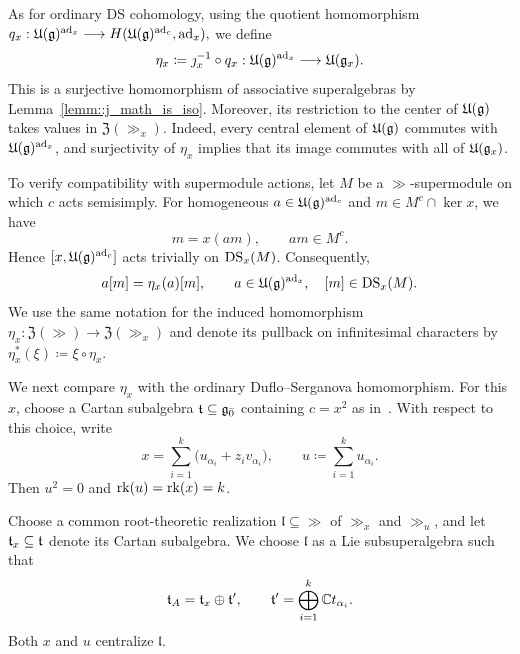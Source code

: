 As for ordinary DS cohomology, using the quotient homomorphism
$
q_x:\UE(\gg)^{\ad_x}
\longrightarrow H(\UE(\gg)^{\ad_c},\ad_x),
$
we define
\begin{equation}\label{eq::generalized_DS_eta}
\eta_x\coloneqq\jmath_x^{-1}\circ q_x:
\UE(\gg)^{\ad_x}\longrightarrow\UE(\gg_x).
\end{equation}
This is a surjective homomorphism of associative superalgebras by Lemma~\ref{lemm::j_math_is_iso}. Moreover, its restriction to the center of $\UE(\gg)$ takes values in $\mathfrak{Z}(\gg_x)$. Indeed, every central element of $\UE(\gg)$ commutes with $\UE(\gg)^{\ad_x}$, and surjectivity of $\eta_x$ implies that its image commutes with all of $\UE(\gg_x)$.

To verify compatibility with supermodule actions, let $M$ be a $\gg$-supermodule on which $c$ acts semisimply. For homogeneous $a\in\UE(\gg)^{\ad_c}$ and $m\in M^c\cap\ker x$, we have
\begin{equation}
[x,a]m=x(am),
\qquad am\in M^c.
\end{equation}
Hence $[x,\UE(\gg)^{\ad_c}]$ acts trivially on $\DS_x(M)$. Consequently,
\begin{equation}\label{eq::generalized_DS_eta_action}
a[m]=\eta_x(a)[m],
\qquad
a\in\UE(\gg)^{\ad_x},\quad [m]\in\DS_x(M).
\end{equation}
We use the same notation for the induced homomorphism
$
\eta_x:\mathfrak{Z}(\gg)\longrightarrow\mathfrak{Z}(\gg_x)
$
and denote its pullback on infinitesimal characters by
$
\eta_x^{\ast}(\xi)\coloneqq\xi\circ\eta_x.
$

We next compare $\eta_x$ with the ordinary Duflo--Serganova homomorphism. 
For this $x$, choose a Cartan subalgebra $\tt\subseteq\even$ containing $c=x^2$ as in~\cite[Lemma~3.9]{Sherman2025}. With respect to this choice, write
\begin{equation}
x=\sum_{i=1}^{k}
\bigl(u_{\alpha_i}+z_i v_{\alpha_i}\bigr),
\qquad
u\coloneqq\sum_{i=1}^{k}u_{\alpha_i}.
\end{equation}
Then $u^2=0$ and $\rk(u)=\rk(x)=k$.

Choose a common root-theoretic realization $\mathfrak{l}\subseteq\gg$ of $\gg_x$ and $\gg_u$, and let $\tt_x\subseteq\tt$ denote its Cartan subalgebra. We choose $\mathfrak{l}$ as a Lie subsuperalgebra such that
\begin{equation}
\tt_{A}=\tt_x\oplus\tt',
\qquad
\tt'=\bigoplus_{i=1}^{k}\CC t_{\alpha_i}.
\end{equation}
Both $x$ and $u$ centralize $\mathfrak{l}$.

